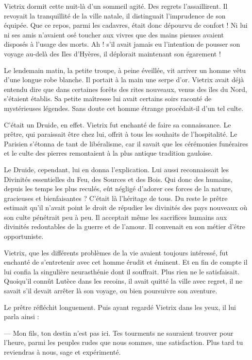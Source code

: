 \documentclass[a4paper, 11pt, oneside, polutonikogreek, french]{article}
\begin{document}
Vietrix dormit cette nuit-là d'un sommeil agité. Des regrets l'assaillirent. Il revoyait la tranquillité de la ville natale, il distinguait l'imprudence de son équipée. Que ce repos, parmi les cadavres, était donc dépourvu de confort ! Ni lui ni ses amis n'avaient osé toucher aux vivres que des mains pieuses avaient disposés à l'usage des morts. Ah ! s'il avait jamais eu l'intention de pousser son voyage au-delà des Iles d'Hyères, il déplorait maintenant son égarement !

Le lendemain matin, la petite troupe, à peine éveillée, vit arriver un homme vêtu d'une longue robe blanche. Il portait à la main une serpe d'or. Vietrix avait déjà entendu dire que dans certaines forêts des rites nouveaux, venus des îles du Nord, s'étaient établis. Sa petite maîtresse lui avait certains soirs raconté de mystérieuses légendes. Sans doute cet homme étrange procédait-il d'un tel culte.

C'était un Druide, en effet. Vietrix fut enchanté de faire sa connaissance. Le prêtre, qui paraissait être chez lui, offrit à tous les souhaits de l'hospitalité. Le Parisien s'étonna de tant de libéralisme, car il savait que les cérémonies funéraires et le culte des pierres remontaient à la plus antique tradition gauloise.

Le Druide, cependant, lui en donna l'explication. Lui aussi reconnaissait les Divinités essentielles du Feu, des Sources et des Bois. Qui donc des humains, depuis les temps les plus reculés, eût négligé d'adorer ces forces de la nature, gracieuses et bienfaisantes ? C'était là l'héritage de tous. Du reste le prêtre estimait qu'il n'avait point le droit de répudier les divinités des pays nouveaux où son culte pénétrait peu à peu. Il acceptait même les sacrifices humains aux divinités redoutables de la guerre et de l'amour. Il convenait en son métier d'être opportuniste.

Vietrix, que les différents problèmes de la vie avaient toujours intéressé, fut enchanté de s'entretenir avec cet homme érudit et éminent. Et en fin de compte il lui confia la singulière neurasthénie dont il souffrait. Plus rien ne le satisfaisait. Quoiqu'il connût Lutèce dans les recoins, il avait quitté la ville avec regret, il ne savait s'il devait arrêter là son voyage, ou bien poursuivre son aventure.

Le prêtre réfléchit longuement. Puis ayant regardé Vietrix dans les yeux, il lui parla ainsi :

--- Mon fils, ton destin n'est pas ici. Tes tourments ne sauraient trouver pour l'heure, parmi les peuples rudes que nous sommes, une satisfaction. Plus tard tu reviendras à nous, sage et expérimenté.
\end{document}
